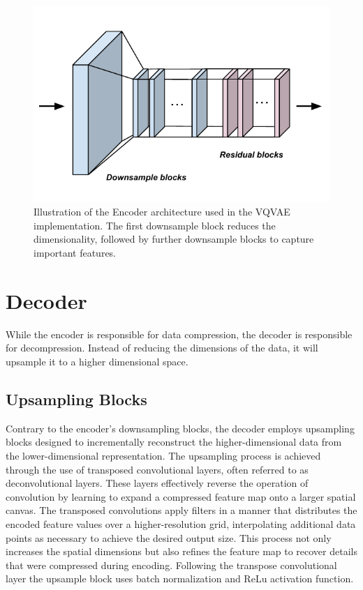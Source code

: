 \begin{figure}[H]
    \includegraphics[scale=0.8]{figures/figure-pdf/Encoder.pdf}
    \caption{Illustration of the Encoder architecture used in the VQVAE implementation. The first downsample block reduces the dimensionality, followed by further downsample blocks to capture important features.}
\end{figure}

\section{Decoder}
While the encoder is responsible for data compression, the decoder is responsible for decompression. Instead of reducing the dimensions of the data, it will upsample it to a higher dimensional space.

\subsection{Upsampling Blocks}
Contrary to the encoder's downsampling blocks, the decoder employs upsampling blocks designed to incrementally reconstruct the higher-dimensional data from the lower-dimensional representation.  
The upsampling process is achieved through the use of transposed convolutional layers, often referred to as deconvolutional layers. These layers effectively reverse the operation of convolution by learning to expand a compressed feature map onto a larger spatial canvas.
The transposed convolutions apply filters in a manner that distributes the encoded feature values over a higher-resolution grid, interpolating additional data points as necessary to achieve the desired output size.
This process not only increases the spatial dimensions but also refines the feature map to recover details that were compressed during encoding.
Following the transpose convolutional layer the upsample block uses batch normalization and ReLu activation function.


